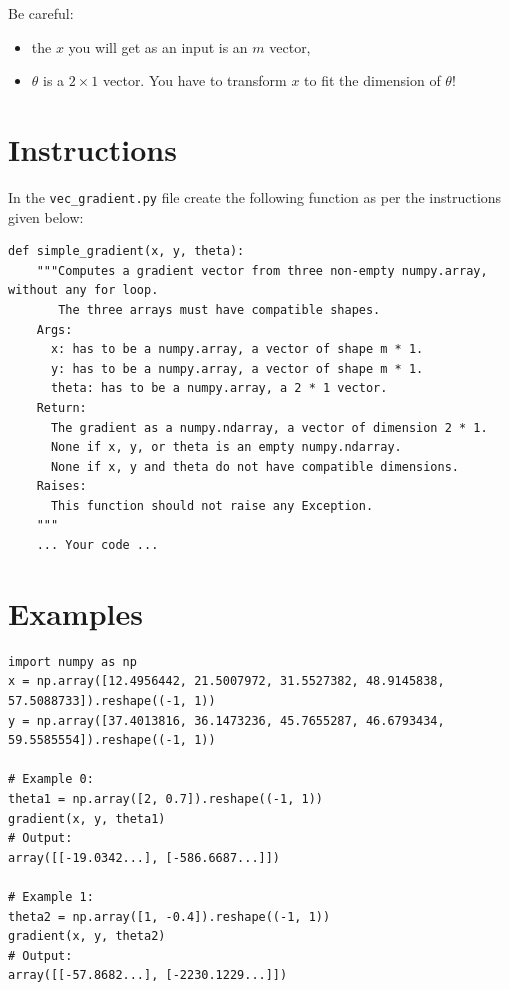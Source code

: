 \documentclass{42-en}
\begin{document}
Be careful:
\begin{itemize}
  \item the $x$ you will get as an input is an $m$ vector,
  \item $\theta$ is a $2 \times 1$ vector. You have to transform $x$ to fit the dimension of $\theta$!
\end{itemize}

\section*{Instructions}
In the \texttt{vec\_gradient.py} file create the following function as per the instructions given below:
\par
\begin{verbatim}
def simple_gradient(x, y, theta):
    """Computes a gradient vector from three non-empty numpy.array, without any for loop.
       The three arrays must have compatible shapes.
    Args:
      x: has to be a numpy.array, a vector of shape m * 1.
      y: has to be a numpy.array, a vector of shape m * 1.
      theta: has to be a numpy.array, a 2 * 1 vector.
    Return:
      The gradient as a numpy.ndarray, a vector of dimension 2 * 1.
      None if x, y, or theta is an empty numpy.ndarray.
      None if x, y and theta do not have compatible dimensions.
    Raises:
      This function should not raise any Exception.
    """
    ... Your code ...
\end{verbatim}

\section*{Examples}

\begin{verbatim}
import numpy as np
x = np.array([12.4956442, 21.5007972, 31.5527382, 48.9145838, 57.5088733]).reshape((-1, 1))
y = np.array([37.4013816, 36.1473236, 45.7655287, 46.6793434, 59.5585554]).reshape((-1, 1))

# Example 0:
theta1 = np.array([2, 0.7]).reshape((-1, 1))
gradient(x, y, theta1)
# Output:
array([[-19.0342...], [-586.6687...]])

# Example 1:
theta2 = np.array([1, -0.4]).reshape((-1, 1))
gradient(x, y, theta2)
# Output:
array([[-57.8682...], [-2230.1229...]])
\end{verbatim}
\end{document}
